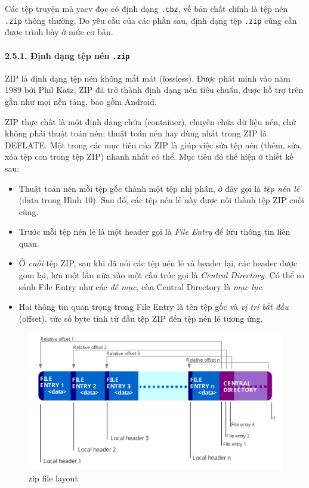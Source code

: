 Các tệp truyện mà yacv đọc có định dạng \texttt{.cbz}, về bản chất chính
là tệp nén \texttt{.zip} thông thường. Do yêu cầu của các phần sau, định
dạng tệp \texttt{.zip} cũng cần được trình bày ở mức cơ bản.

\hypertarget{ux111ux1ecbnh-dux1ea1ng-tux1ec7p-nuxe9n-.zip}{%
  \paragraph{\texorpdfstring{2.5.1. Định dạng tệp nén
      \texttt{.zip}}{2.5.1. Định dạng tệp nén .zip}}\label{ux111ux1ecbnh-dux1ea1ng-tux1ec7p-nuxe9n-.zip}}

ZIP là định dạng tệp nén không mất mát (lossless). Được phát minh vào
năm 1989 bởi Phil Katz, ZIP đã trở thành định dạng nén tiêu chuẩn, được
hỗ trợ trên gần như mọi nền tảng, bao gồm Android.

ZIP thực chất là một định dạng chứa (container), chuyên chứa dữ liệu
nén, chứ không phải thuật toán nén; thuật toán nén hay dùng nhất trong
ZIP là DEFLATE. Một trong các mục tiêu của ZIP là giúp việc sửa tệp nén
(thêm, sửa, xóa tệp con trong tệp ZIP) nhanh nhất có thể. Mục tiêu đó
thể hiện ở thiết kế sau:

\begin{itemize}
  
  \item
        Thuật toán nén mỗi tệp gốc thành một tệp nhị phân, ở đây gọi là
        \emph{tệp nén lẻ} (data trong Hình 10). Sau đó, các tệp nén lẻ này
        được nối thành tệp ZIP cuối cùng.
  \item
        Trước mỗi tệp nén lẻ là một header gọi là \emph{File Entry} để lưu
        thông tin liên quan.
  \item
        Ở \emph{cuối} tệp ZIP, sau khi đã nối các tệp nén lẻ và header lại,
        các header được gom lại, lưu một lần nữa vào một cấu trúc gọi là
        \emph{Central Directory}. Có thể so sánh File Entry như các \emph{đề
          mục}, còn Central Directory là \emph{mục lục}.
  \item
        Hai thông tin quan trọng trong File Entry là tên tệp gốc và \emph{vị
          trí bắt đầu} (offset), tức số byte tính từ đầu tệp ZIP đến tệp nén lẻ
        tương ứng.
\end{itemize}

\begin{figure}
  \centering
  \includegraphics{../images/ZIP-64_Internal_Layout.svg}
  \caption{zip file layout}
\end{figure}

